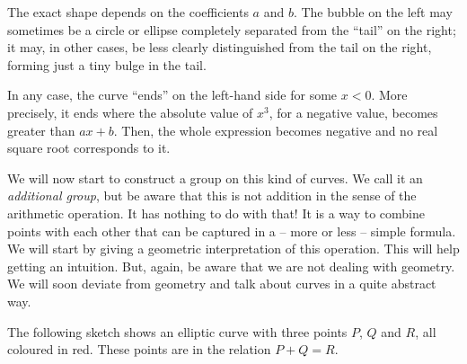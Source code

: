 \documentclass[tikz]{scrreprt}
\begin{document}
The exact shape depends on the coefficients $a$ and $b$.
The bubble on the left may sometimes be a circle or ellipse
completely separated from the ``tail'' on the right;
it may, in other cases, be less clearly distinguished
from the tail on the right, forming just a tiny bulge in the tail.

In any case, the curve ``ends'' on the left-hand side
for some $x < 0$. More precisely, it ends where 
the absolute value of $x^3$, for a negative
value, becomes greater than $ax + b$. Then, the whole 
expression becomes negative and no real square root corresponds to it.

We will now start to construct a group on this kind of curves.
We call it an \emph{additional group}, but be aware that this
is not addition in the sense of the arithmetic operation.
It has nothing to do with that! It is a way to combine points
with each other that can be captured in a  -- more or less -- 
simple formula. We will start by giving a geometric interpretation
of this operation. This will help getting an intuition.
But, again, be aware that we are not dealing with geometry.
We will soon deviate from geometry and talk about curves
in a quite abstract way.

The following sketch shows an elliptic curve
with three points $P$, $Q$ and $R$,
all coloured in red.
These points are in the relation
$P + Q = R$.

\begin{center}
\end{center}
\end{document}
